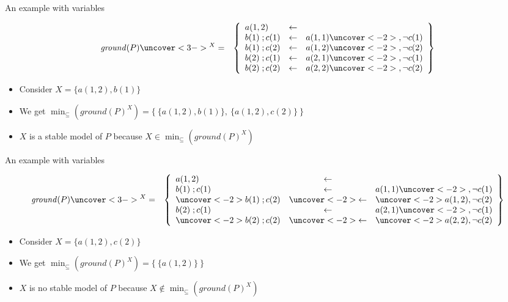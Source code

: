 \begin{frame}{An example with variables}

  \begin{eqnarray*}
    \mathit{ground}(P)\uncover<3->{^X}
    &=&
    \left\{
      \begin{array}{lcl}
        a(1,2)&\leftarrow&
        \\
        b(1)\;;c(1)&\leftarrow& a(1,1)\uncover<-2>{, {\neg c(1)}}
        \\
        b(1)\;;c(2)&\leftarrow& a(1,2)\uncover<-2>{, {\neg c(2)}}
        \\
        b(2)\;;c(1)&\leftarrow& a(2,1)\uncover<-2>{, {\neg c(1)}}
        \\
        b(2)\;;c(2)&\leftarrow& a(2,2)\uncover<-2>{, {\neg c(2)}}
      \end{array}
    \right\}
  \end{eqnarray*}

\begin{itemize}
\item<2->
Consider $X=\{a(1,2),  b(1)\}$
\item <4->
We get
\(
\min_\subseteq(\mathit{ground}(P)^X)
=
\{\ \{a(1,2),  b(1)\},\ \{a(1,2),  c(2)\}\ \}
\)
\item<5->
$X$ is a  stable model of $P$ because
\(
X\in\min_\subseteq(\mathit{ground}(P)^X)
\)
\end{itemize}
\end{frame}
\begin{frame}{An example with variables}

  \begin{eqnarray*}
    \mathit{ground}(P)\uncover<3->{^X}
    &=&
    \left\{
      \begin{array}{lcl}
        a(1,2)&\leftarrow&
        \\
        b(1)\;;c(1)&\leftarrow& a(1,1)\uncover<-2>{, {\neg c(1)}}
        \\
\uncover<-2>{b(1)\;;c(2)}&\uncover<-2>{\leftarrow}&\uncover<-2>{a(1,2), {\neg c(2)}}
        \\
        b(2)\;;c(1)&\leftarrow& a(2,1)\uncover<-2>{, {\neg c(1)}}
        \\
\uncover<-2>{b(2)\;;c(2)}&\uncover<-2>{\leftarrow}&\uncover<-2>{a(2,2), {\neg c(2)}}
  \end{array}
\right\}
\end{eqnarray*}

\begin{itemize}
\item <2->
Consider $X=\{a(1,2),  c(2)\}$
\item <4->
We get
\(
\min_\subseteq(\mathit{ground}(P)^X)
=
\{\ \{a(1,2)\}\ \}
\)
\item<5->
$X$ is no stable model of $P$ because
\(
X\not\in\min_\subseteq(\mathit{ground}(P)^X)
\)
\end{itemize}
\end{frame}
